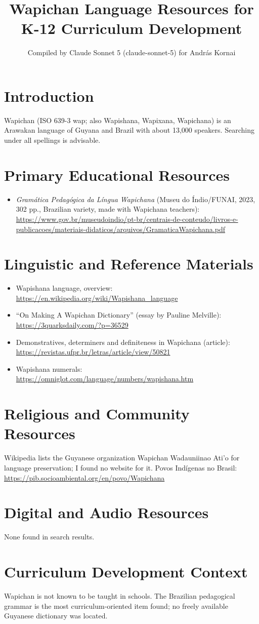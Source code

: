 \documentclass[12pt]{article}
\title{Wapichan Language Resources for K-12 Curriculum Development}
\author{Compiled by Claude Sonnet 5 (claude-sonnet-5) for Andr\'as Kornai}
\date{}
\begin{document}
\maketitle
\section{Introduction}
Wapichan (ISO 639-3 wap; also Wapishana, Wapixana, Wapichana) is an Arawakan language of Guyana and Brazil with about 13,000 speakers. Searching under all spellings is advisable.
\section{Primary Educational Resources}
\begin{itemize}
\item \emph{Gram\'atica Pedag\'ogica da L\'ingua Wapichana} (Museu do Índio/FUNAI, 2023, 302 pp., Brazilian variety, made with Wapichana teachers): \url{https://www.gov.br/museudoindio/pt-br/centrais-de-conteudo/livros-e-publicacoes/materiais-didaticos/arquivos/GramaticaWapichana.pdf}
\end{itemize}
\section{Linguistic and Reference Materials}
\begin{itemize}
\item Wapishana language, overview: \url{https://en.wikipedia.org/wiki/Wapishana_language}
\item ``On Making A Wapichan Dictionary'' (essay by Pauline Melville): \url{https://3quarksdaily.com/?p=36529}
\item Demonstratives, determiners and definiteness in Wapichana (article): \url{https://revistas.ufpr.br/letras/article/view/50821}
\item Wapishana numerals: \url{https://omniglot.com/language/numbers/wapishana.htm}
\end{itemize}
\section{Religious and Community Resources}
Wikipedia lists the Guyanese organization Wapichan Wadauniinao Ati'o for language preservation; I found no website for it. Povos Ind\'igenas no Brasil: \url{https://pib.socioambiental.org/en/povo/Wapichana}
\section{Digital and Audio Resources}
None found in search results.
\section{Curriculum Development Context}
Wapichan is not known to be taught in schools. The Brazilian pedagogical grammar is the most curriculum-oriented item found; no freely available Guyanese dictionary was located.
\end{document}
